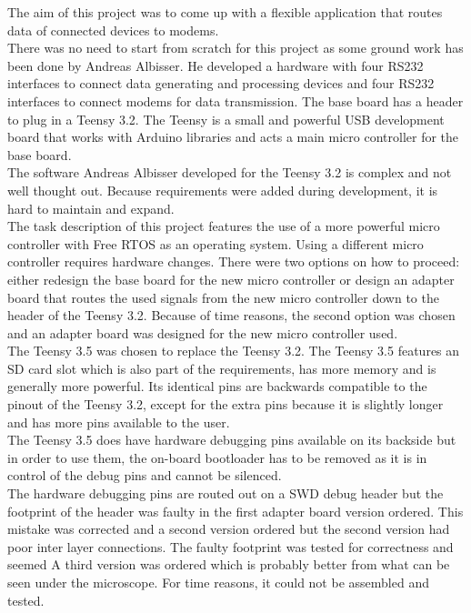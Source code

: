 %
The aim of this project was to come up with a flexible application that routes data of connected devices to modems.\\
There was no need to start from scratch for this project as some ground work has been done by Andreas Albisser. He developed a hardware with four RS232 interfaces to connect data generating and processing devices and four RS232 interfaces to connect modems for data transmission. The base board has a header to plug in a Teensy 3.2. The Teensy is a small and powerful USB development board that works with Arduino libraries and acts a main micro controller for the base board.\\
The software Andreas Albisser developed for the Teensy 3.2 is complex and not well thought out. Because requirements were added during development, it is hard to maintain and expand.\\
The task description of this project features the use of a more powerful micro controller with Free RTOS as an operating system. Using a different micro controller requires hardware changes. There were two options on how to proceed: either redesign the base board for the new micro controller or design an adapter board that routes the used signals from the new micro controller down to the header of the Teensy 3.2. Because of time reasons, the second option was chosen and an adapter board was designed for the new micro controller used.\\
The Teensy 3.5 was chosen to replace the Teensy 3.2. The Teensy 3.5 features an SD card slot which is also part of the requirements, has more memory and is generally more powerful. Its identical pins are backwards compatible to the pinout of the Teensy 3.2, except for the extra pins because it is slightly longer and has more pins available to the user.\\
The Teensy 3.5 does have hardware debugging pins available on its backside but in order to use them, the on-board bootloader has to be removed as it is in control of the debug pins and cannot be silenced.\\
The hardware debugging pins are routed out on a SWD debug header but the footprint of the header was faulty in the first adapter board version ordered. This mistake was corrected and a second version ordered but the second version had poor inter layer connections. The faulty footprint was tested for correctness and seemed A third version was ordered which is probably better from what can be seen under the microscope. For time reasons, it could not be assembled and tested.\\
